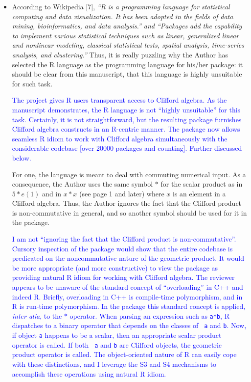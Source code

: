 \documentclass{article}
\begin{document}
\begin{itemize}
\item According to Wikipedia [7], {\em “R is a programming language for statistical computing and
data visualization. It has been adopted in the fields of data mining, bioinformatics, and data
analysis.” and “Packages add the capability to implement various statistical techniques such
as linear, generalized linear and nonlinear modeling, classical statistical tests, spatial analysis,
time-series analysis, and clustering.”}
Thus, it is really puzzling why the Author has selected the R language as the programming
language for his/her package: it should be clear from this manuscript, that this language is
highly unsuitable for such task.

\textcolor{blue}{The project gives R users transparent access to
  Clifford algebra.  As the manuscript demonstrates, the R language is
  not ``highly unsuitable'' for this task.  Certainly, it is not
  straightforward, but the resulting package furnishes Clifford
  algebra constructs in an R-centric manner.  The package now allows
  seamless R idiom to work with Clifford algebra simultaneously with
  the considerable codebase [over 20000 packages and counting].
  Further discussed below.}

For one, the language is meant to deal with commuting numerical
input. As a consequence, the Author uses the same symbol $*$ for the
scalar product as in $5* e(1)$ and in $x * x$ (see page 1 and later)
where $x$ is an element in a Clifford algebra.  Thus, the Author
ignores the fact that the Clifford product is non-commutative in
general, and so another symbol should be used for it in the package.

\textcolor{blue}{I am not ``ignoring the fact that the Clifford
  product is non-commutative''.  Cursory inspection of the package
  would show that the entire codebase is predicated on the
  noncommutative nature of the geometric product.  It would be more
  appropriate (and more constructive) to view the package as providing
  natural R idiom for working with Clifford algebra.  The reviewer
  appears to be unaware of the standard concept of ``overloading'' in
  C++ and indeed R.  Briefly, overloading in C++ is compile-time
  polymorphism, and in R is run-time polymorphism.  In the package
  this standard concept is applied, {\em inter alia}, to the $*$
  operator.  When parsing an expression such as {\tt a*b}, R
  dispatches to a binary operator that depends on the classes of {\tt
    a} and {\tt b}.  Now, if object {\tt a} happens to be a scalar,
  then an appropriate scalar product operator is called.  If both {\tt
    a} and {\tt b} are Clifford objects, the geometric product
  operator is called.  The object-oriented nature of R can easily cope
  with these distinctions, and I leverage the S3 and S4 mechanisms to
  accomplish these operations using natural R idiom.}


\end{itemize}
\end{document}
